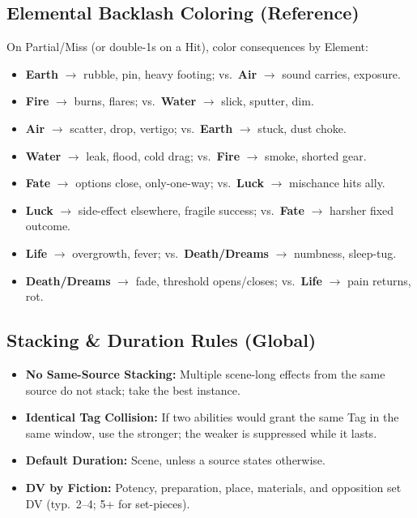 \subsection{Elemental Backlash Coloring (Reference)}
On Partial/Miss (or double-1s on a Hit), color consequences by Element:
\begin{multicols}{2}
\begin{itemize}
  \item \textbf{Earth} $\rightarrow$ rubble, pin, heavy footing; vs.\ \textbf{Air} $\rightarrow$ sound carries, exposure.
  \item \textbf{Fire} $\rightarrow$ burns, flares; vs.\ \textbf{Water} $\rightarrow$ slick, sputter, dim.
  \item \textbf{Air} $\rightarrow$ scatter, drop, vertigo; vs.\ \textbf{Earth} $\rightarrow$ stuck, dust choke.
  \item \textbf{Water} $\rightarrow$ leak, flood, cold drag; vs.\ \textbf{Fire} $\rightarrow$ smoke, shorted gear.
  \item \textbf{Fate} $\rightarrow$ options close, only-one-way; vs.\ \textbf{Luck} $\rightarrow$ mischance hits ally.
  \item \textbf{Luck} $\rightarrow$ side-effect elsewhere, fragile success; vs.\ \textbf{Fate} $\rightarrow$ harsher fixed outcome.
  \item \textbf{Life} $\rightarrow$ overgrowth, fever; vs.\ \textbf{Death/Dreams} $\rightarrow$ numbness, sleep-tug.
  \item \textbf{Death/Dreams} $\rightarrow$ fade, threshold opens/closes; vs.\ \textbf{Life} $\rightarrow$ pain returns, rot.
\end{itemize}
\end{multicols}

\subsection{Stacking \& Duration Rules (Global)}
\begin{itemize}
  \item \textbf{No Same-Source Stacking:} Multiple scene-long effects from the same source do not stack; take the best instance.
  \item \textbf{Identical Tag Collision:} If two abilities would grant the same Tag in the same window, use the stronger; the weaker is suppressed while it lasts.
  \item \textbf{Default Duration:} Scene, unless a source states otherwise.
  \item \textbf{DV by Fiction:} Potency, preparation, place, materials, and opposition set DV (typ.\ 2--4; 5+ for set-pieces).
\end{itemize}

